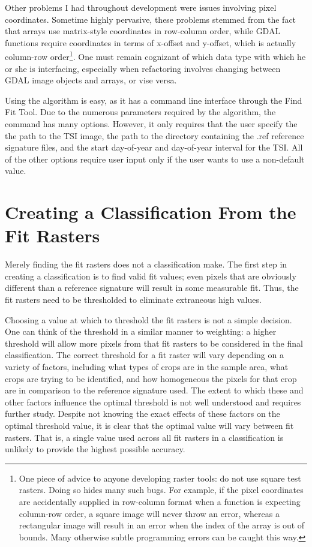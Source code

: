 Other problems I had throughout development were issues involving pixel coordinates. Sometime highly pervasive, these problems stemmed from the fact that arrays use matrix-style coordinates in row-column order, while GDAL functions require coordinates in terms of x-offset and y-offset, which is actually column-row order\footnote{One piece of advice to anyone developing raster tools: do not use square test rasters. Doing so hides many such bugs. For example, if the pixel coordinates are accidentally supplied in row-column format when a function is expecting column-row order, a square image will never throw an error, whereas a rectangular image will result in an error when the index of the array is out of bounds. Many otherwise subtle programming errors can be caught this way.}. One must remain cognizant of which data type with which he or she is interfacing, especially when refactoring involves changing between GDAL image objects and arrays, or vise versa.

Using the algorithm is easy, as it has a command line interface through the Find Fit Tool. Due to the numerous parameters required by the algorithm, the command has many options. However, it only requires that the user specify the the path to the TSI image, the path to the directory containing the .ref reference signature files, and the start day-of-year and day-of-year interval for the TSI. All of the other options require user input only if the user wants to use a non-default value.

\section{Creating a Classification From the Fit Rasters}
\label{appendix:tools:classify}

Merely finding the fit rasters does not a classification make. The first step in creating a classification is to find valid fit values; even pixels that are obviously different than a reference signature will result in some measurable fit. Thus, the fit rasters need to be thresholded to eliminate extraneous high values.

Choosing a value at which to threshold the fit rasters is not a simple decision. One can think of the threshold in a similar manner to weighting:  a higher threshold will allow more pixels from that fit rasters to be considered in the final classification. The correct threshold for a fit raster will vary depending on a variety of factors, including what types of crops are in the sample area, what crops are trying to be identified, and how homogeneous the pixels for that crop are in comparison to the reference signature used. The extent to which these and other factors influence the optimal threshold is not well understood and requires further study. Despite not knowing the exact effects of these factors on the optimal threshold value, it is clear that the optimal value will vary between fit rasters. That is, a single value used across all fit rasters in a classification is unlikely to provide the highest possible accuracy.

